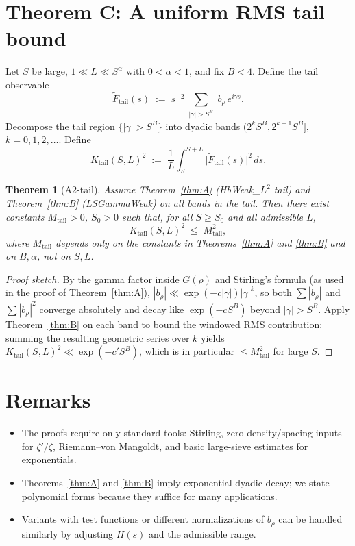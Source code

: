 \documentclass[11pt]{article}
\theoremstyle{plain}
\newtheorem{theorem}{Theorem}[section]
\theoremstyle{definition}
\begin{document}
\section{Theorem C: A uniform RMS tail bound}
Let $S$ be large, $1 \ll L \ll S^\alpha$ with $0<\alpha<1$, and fix $B<4$. Define the tail observable
\[
  \widetilde F_{\mathrm{tail}}(s) \;:=\; s^{-2} \sum_{\substack{|\gamma|>S^B}} b_\rho\, e^{i\gamma s}.
\]
  Decompose the tail region $\{|\gamma|>S^B\}$ into dyadic bands $(2^k S^B, 2^{k+1} S^B]$, $k=0,1,2,\dots$. Define
\[
  K_{\mathrm{tail}}(S,L)^2 \;:=\; \frac{1}{L} \int_{S}^{S+L} \bigl|\widetilde F_{\mathrm{tail}}(s)\bigr|^2 \, ds.
\]
\begin{theorem}[A2-tail]\label{thm:C}
Assume Theorem~\ref{thm:A} (HbWeak\_{$L^2$} tail) and Theorem~\ref{thm:B} (LSGammaWeak) on all bands in the tail. Then there exist constants $M_{\mathrm{tail}}>0$, $S_0>0$ such that, for all $S \ge S_0$ and all admissible $L$,
\[
  K_{\mathrm{tail}}(S,L)^2 \;\le\; M_{\mathrm{tail}}^2,
\]
where $M_{\mathrm{tail}}$ depends only on the constants in Theorems~\ref{thm:A} and \ref{thm:B} and on $B,\alpha$, not on $S,L$.
\end{theorem}
\begin{proof}[Proof sketch]
By the gamma factor inside $G(\rho)$ and Stirling's formula (as used in the proof of Theorem~\ref{thm:A}), $|b_\rho| \ll \exp(-c|\gamma|)|\gamma|^{k}$, so both $\sum |b_\rho|$ and $\sum |b_\rho|^2$ converge absolutely and decay like $\exp(-c S^B)$ beyond $|\gamma|>S^B$. Apply Theorem~\ref{thm:B} on each band to bound the windowed RMS contribution; summing the resulting geometric series over $k$ yields $K_{\mathrm{tail}}(S,L)^2 \ll \exp(-c' S^B)$, which is in particular $\le M_{\mathrm{tail}}^2$ for large $S$.
\end{proof}

\section{Remarks}
\begin{itemize}
  \item The proofs require only standard tools: Stirling, zero-density/spacing inputs for $\zeta'/\zeta$, Riemann--von Mangoldt, and basic large-sieve estimates for exponentials.
  \item Theorems~\ref{thm:A} and \ref{thm:B} imply exponential dyadic decay; we state polynomial forms because they suffice for many applications.
  \item Variants with test functions or different normalizations of $b_\rho$ can be handled similarly by adjusting $H(s)$ and the admissible range.
\end{itemize}
\end{document}

